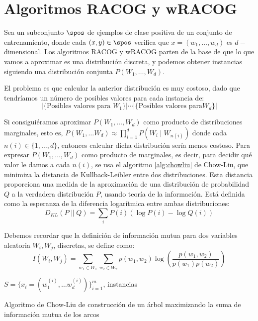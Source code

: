 \section{Algoritmos RACOG y wRACOG}
Sea un subconjunto $\spos$ de ejemplos de clase positiva de un conjunto de entrenamiento, donde cada $(x,y)\in \spos$ 
verifica que $x = (w_1, \ldots, w_d)$ es $d-$dimensional. Los algoritmos RACOG y wRACOG parten de la base de que lo que vamos
a aproximar es una distribución discreta, y podemos obtener instancias siguiendo una distribución 
conjunta $P(W_1, \ldots, W_d)$.

El problema es que calcular la anterior distribución es muy costoso, dado que tendríamos un número de posibles valores para 
cada instancia de:
\[
  |\{\textrm{Posibles valores para }W_1\}| \cdots |\{\textrm{Posibles valores para} W_d\}|
\]

Si consiguiéramos aproximar $P(W_1, \ldots, W_d)$ como producto de distribuciones marginales, esto es, 
$P(W_1, \ldots W_d) \approx \prod_{i=1}^d P(W_i \mid W_{n(i)})$ donde cada $n(i) \in \{1, \ldots, d\}$,
entonces calcular dicha distribución sería menos costoso. Para expresar $P(W_1, \ldots, W_d)$ como producto de marginales,
es decir, para decidir qué valor le damos a cada $n(i)$, se usa el algoritmo \ref{alg:chowliu} de Chow-Liu,
que minimiza la distancia de Kullback-Leibler entre dos distribuciones. Esta distancia proporciona una medida de la 
aproximación de una distribución de probabilidad $Q$ a la verdadera distribución $P$, usando teoría de la información. 
Está definida como la esperanza de la diferencia logarítmica entre ambas distribuciones:
\[
  D_{KL}(P \parallel Q) = \sum_{i} P(i) \left(\log P(i) - \log Q(i)\right)
\]

Debemos recordar que la definición de información mutua para dos variables aleatoria $W_i, W_j$, discretas, 
se define como:
\[
  I(W_i, W_j) = \sum_{w_1\in W_1} \sum_{w_2\in W_2} p(w_1, w_2) \log\left(\frac{p(w_1,w_2)}{p(w_1) p(w_2)}\right)
\]

\begin{algorithm}[H]
\begin{algorithmic}[1]
 \REQUIRE $S = \{x_i=(w_1^{(i)}, \ldots w_d^{(i)})\}_{i=1}^m$, instancias
 \ENDFOR
\end{algorithmic}
\caption{Algoritmo de Chow-Liu de construcción de un árbol maximizando la suma de información
mutua de los arcos}
\label{alg:chowliu}
\end{algorithm}

